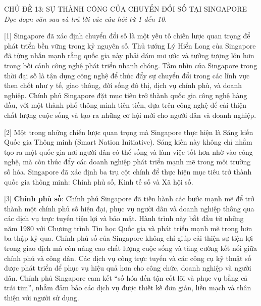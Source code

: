 \documentclass[12pt,a4paper,twoside]{article}
\newenvironment{readingpassage}[1][]{%
    \begin{tcolorbox}[enhanced, colback=grayLight, colframe=secondaryBlue,
        coltitle=textDark, fonttitle=\bfseries, title={#1},
        rounded corners, arc=3mm, boxrule=1pt,
        left=15pt, right=15pt, top=10pt, bottom=10pt,
        breakable, before skip=10pt, after skip=10pt, drop fuzzy shadow]
    \setstretch{1.3}
}{\end{tcolorbox}}
\begin{document}
\newpage
\label{a_cd13}
\begin{topicbox}{\large CHỦ ĐỀ 13: SỰ THÀNH CÔNG CỦA CHUYỂN ĐỔI SỐ TẠI SINGAPORE}
\vspace{8pt}
\textit{Đọc đoạn văn sau và trả lời các câu hỏi từ 1 đến 10.}
\vspace{6pt}
\end{topicbox}
\vspace{5pt}
\begin{readingpassage}[]
[1] Singapore đã xác định chuyển đổi số là một yếu tố chiến lược quan trọng để phát triển bền vững trong kỷ nguyên số. Thủ tướng Lý Hiển Long của Singapore đã từng nhấn mạnh rằng quốc gia này phải dám mơ ước và tưởng tượng lớn hơn trong bối cảnh công nghệ phát triển nhanh chóng. Tầm nhìn của Singapore trong thời đại số là tận dụng công nghệ để thúc đẩy sự chuyển đổi trong các lĩnh vực then chốt như y tế, giao thông, đời sống đô thị, dịch vụ chính phủ, và doanh nghiệp. Chính phủ Singapore đặt mục tiêu trở thành quốc gia công nghệ hàng đầu, với một thành phố thông minh tiên tiến, dựa trên công nghệ để cải thiện chất lượng cuộc sống và tạo ra những cơ hội mới cho người dân và doanh nghiệp.

[2] Một trong những chiến lược quan trọng mà Singapore thực hiện là Sáng kiến Quốc gia Thông minh (Smart Nation Initiative). Sáng kiến này không chỉ nhằm tạo ra một quốc gia nơi người dân có thể sống và làm việc tốt hơn nhờ vào công nghệ, mà còn thúc đẩy các doanh nghiệp phát triển mạnh mẽ trong môi trường số hóa. Singapore đã xác định ba trụ cột chính để thực hiện mục tiêu trở thành quốc gia thông minh: Chính phủ số, Kinh tế số và Xã hội số.

[3] \textbf{Chính phủ số}: Chính phủ Singapore đã tiến hành các bước mạnh mẽ để trở thành một chính phủ số hiện đại, phục vụ người dân và doanh nghiệp thông qua các dịch vụ trực tuyến tiện lợi và bảo mật. Hành trình này bắt đầu từ những năm 1980 với Chương trình Tin học Quốc gia và phát triển mạnh mẽ trong hơn ba thập kỷ qua. Chính phủ số của Singapore không chỉ giúp cải thiện sự tiện lợi trong giao dịch mà còn nâng cao chất lượng cuộc sống và tăng cường kết nối giữa chính phủ và công dân. Các dịch vụ công trực tuyến và các công cụ kỹ thuật số được phát triển để phục vụ hiệu quả hơn cho công chức, doanh nghiệp và người dân. Chính phủ Singapore cam kết ``số hóa đến tận cốt lõi và phục vụ bằng cả trái tim'', nhằm đảm bảo các dịch vụ được thiết kế đơn giản, liền mạch và thân thiện với người sử dụng.


\end{readingpassage}
\end{document}
